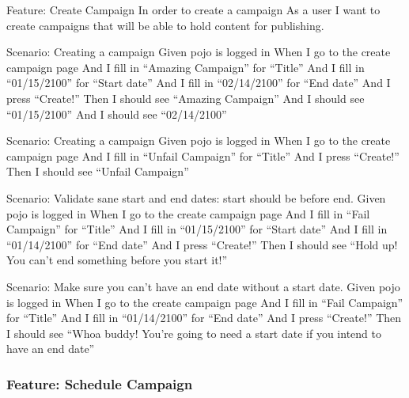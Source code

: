 \documentclass[12pt]{article}
\begin{document}
\begin{hangparas}{0.25in}{1}
Feature: Create Campaign 
In order to create a campaign 
As a user 
I want to create campaigns that will be able to hold content for publishing. 

Scenario: Creating a campaign 
Given pojo is logged in 
When I go to the create campaign page 
And I fill in ``Amazing Campaign'' for ``Title'' 
And I fill in ``01/15/2100'' for ``Start date'' 
And I fill in ``02/14/2100'' for ``End date''   
And I press ``Create!'' 
Then I should see ``Amazing Campaign'' 
And I should see ``01/15/2100'' 
And I should see ``02/14/2100'' 

Scenario: Creating a campaign 
Given pojo is logged in 
When I go to the create campaign page 
And I fill in ``Unfail Campaign'' for ``Title'' 
And I press ``Create!'' 
Then I should see ``Unfail Campaign'' 

Scenario: Validate sane start and end dates: start should be before end. 
Given pojo is logged in 
When I go to the create campaign page 
And I fill in ``Fail Campaign'' for ``Title'' 
And I fill in ``01/15/2100'' for ``Start date'' 
And I fill in ``01/14/2100'' for ``End date'' 
And I press ``Create!'' 
Then I should see ``Hold up! You can't end something before you start it!'' 

Scenario: Make sure you can't have an end date without a start date. 
Given pojo is logged in 
When I go to the create campaign page 
And I fill in ``Fail Campaign'' for ``Title'' 
And I fill in ``01/14/2100'' for ``End date'' 
And I press ``Create!'' 
Then I should see ``Whoa buddy! You're going to need a start date if you intend to have an end date'' 
\end{hangparas}

\subsubsection{Feature: Schedule Campaign}
\end{document}
